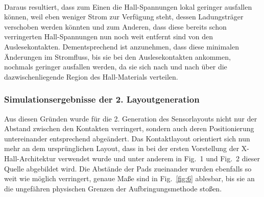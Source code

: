 \documentclass[12pt, a4paper]{article}
\begin{document}
\paragraph{}
Daraus resultiert, dass zum Einen die Hall-Spannungen lokal geringer ausfallen können, weil eben weniger Strom zur Verfügung steht, dessen Ladungsträger verschoben werden könnten und zum Anderen, dass diese bereits schon verringerten Hall-Spannungen nun noch weit entfernt sind von den Auslesekontakten. Dementsprechend ist anzunehmen, dass diese minimalen Änderungen im Stromfluss, bis sie bei den Auslesekontakten ankommen, nochmals geringer ausfallen werden, da sie sich nach und nach über die dazwischenliegende Region des Hall-Materials verteilen.

\subsubsection{Simulationsergebnisse der 2. Layoutgeneration}
Aus diesen Gründen wurde für die 2. Generation des Sensorlayouts nicht nur der Abstand zwischen den Kontakten verringert, sondern auch deren Positionierung untereinander entsprechend abgeändert.\newline
Das Kontaktlayout orientiert sich nun mehr an dem ursprünglichen Layout, dass in \cite{cres18} bei der ersten Vorstellung der X-Hall-Architektur verwendet wurde und unter anderem in Fig.~1 und Fig.~2 dieser Quelle abgebildet wird.\newline
Die Abstände der Pads zueinander wurden ebenfalls so weit wie möglich verringert, genaue Maße sind in Fig.~\ref{fig:6} ablesbar, bis sie an die ungefähren physischen Grenzen der Aufbringungsmethode stoßen. 
\end{document}
